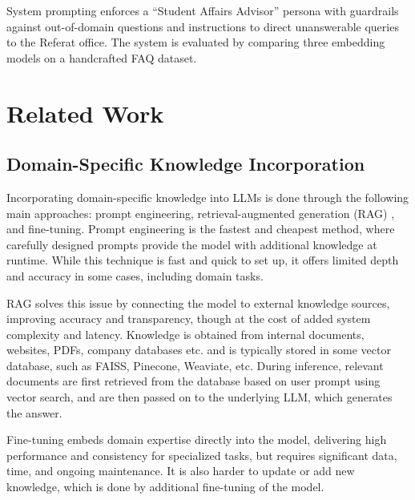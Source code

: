 \documentclass[fleqn,moreauthors,10pt]{ds_report}
\begin{document}

System prompting enforces a ``Student Affairs Advisor'' persona with guardrails against out-of-domain questions and instructions to direct unanswerable queries to the Referat office.
The system is evaluated by comparing three embedding models on a handcrafted FAQ dataset.

\section*{Related Work}
\subsection*{Domain-Specific Knowledge Incorporation}
Incorporating domain-specific knowledge into LLMs is done through the following main approaches: prompt engineering, retrieval-augmented generation (RAG) \cite{lewis2020retrieval}, and fine-tuning.
Prompt engineering is the fastest and cheapest method, where carefully designed prompts provide the model with additional knowledge at runtime. While this technique is fast and quick to set up, it offers limited depth and accuracy in some cases, including domain tasks.

RAG \cite{lewis2020retrieval} solves this issue by connecting the model to external knowledge sources, improving accuracy and transparency, though at the cost of added system complexity and latency. Knowledge is obtained from internal documents, websites, PDFs, company databases etc. and is typically stored in some vector database, such as FAISS, Pinecone, Weaviate, etc. During inference, relevant documents are first retrieved from the database based on user prompt using vector search, and are then passed on to the underlying LLM, which generates the answer.

Fine-tuning embeds domain expertise directly into the model, delivering high performance and consistency for specialized tasks, but requires significant data, time, and ongoing maintenance. It is also harder to update or add new knowledge, which is done by additional fine-tuning of the model.
\end{document}
